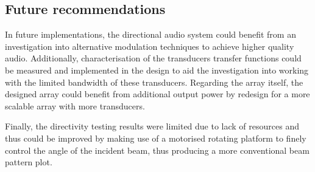 \documentclass[final,32pt]{beamer}
\begin{document}
\begin{frame}[t]
\begin{multicols}{3}
\subsection{Future recommendations}
In future implementations, the directional audio system could benefit from an investigation into alternative modulation techniques to achieve higher quality audio.
Additionally, characterisation of the transducers transfer functions could be measured and implemented in the design to aid the investigation into working with the limited bandwidth of these transducers.
Regarding the array itself, the designed array could benefit from additional output power by redesign for a more scalable array with more transducers.

Finally, the directivity testing results were limited due to lack of resources and thus could be improved by making use of a motorised rotating platform to finely control the angle of the incident beam, thus producing a more conventional beam pattern plot.



\end{multicols}
\end{frame}
\end{document}
